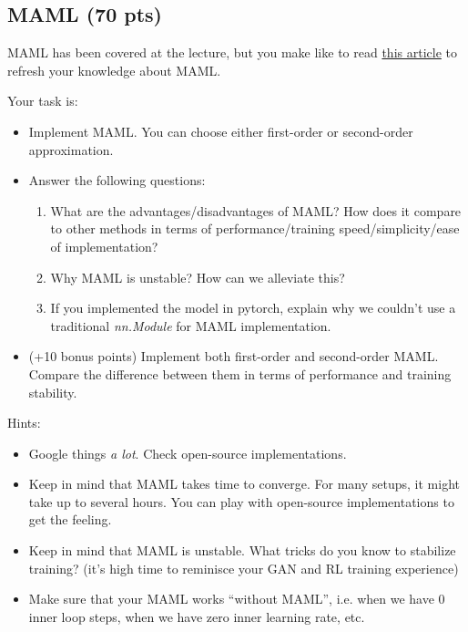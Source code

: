 \documentclass[letterpaper,12pt]{article}
\begin{document}
\subsection{MAML (70 pts)}
MAML has been covered at the lecture, but you make like to read \href{https://www.bayeswatch.com/2018/11/30/HTYM/}{this article} to refresh your knowledge about MAML.

Your task is:
\begin{itemize}
    \item Implement MAML. You can choose either first-order or second-order approximation.
    \item Answer the following questions:
    \begin{enumerate}
        \item What are the advantages/disadvantages of MAML? How does it compare to other methods in terms of performance/training speed/simplicity/ease of implementation?
        \item Why MAML is unstable? How can we alleviate this?
        \item If you implemented the model in pytorch, explain why we couldn't use a traditional \textit{nn.Module} for MAML implementation.
    \end{enumerate}
    \item (+10 bonus points) Implement both first-order and second-order MAML. Compare the difference between them in terms of performance and training stability.
\end{itemize}

Hints:
\begin{itemize}
    \item Google things \textit{a lot}. Check open-source implementations.
    \item Keep in mind that MAML takes time to converge. For many setups, it might take up to several hours. You can play with open-source implementations to get the feeling.
    \item Keep in mind that MAML is unstable. What tricks do you know to stabilize training? (it's high time to reminisce your GAN and RL training experience)
    \item Make sure that your MAML works ``without MAML'', i.e. when we have 0 inner loop steps, when we have zero inner learning rate, etc.
\end{itemize}

\end{document}
